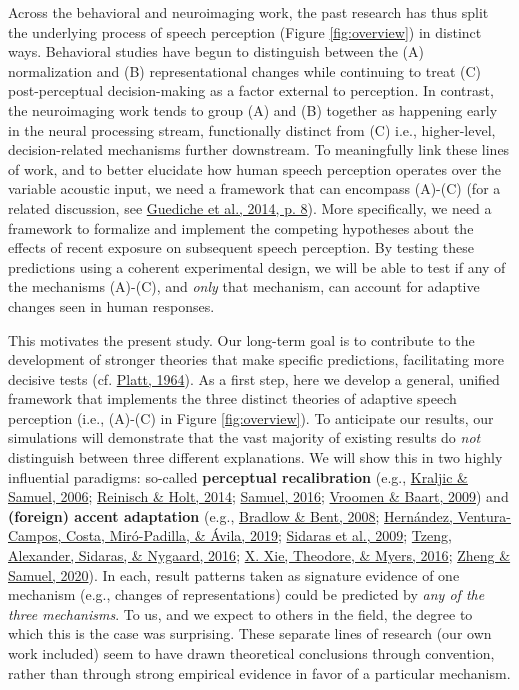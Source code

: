 \documentclass[
  11pt,
  english,
  man,floatsintext]{apa6}
\begin{document}
Across the behavioral and neuroimaging work, the past research has thus split the underlying process of speech perception (Figure \ref{fig:overview}) in distinct ways. Behavioral studies have begun to distinguish between the (A) normalization and (B) representational changes while continuing to treat (C) post-perceptual decision-making as a factor external to perception. In contrast, the neuroimaging work tends to group (A) and (B) together as happening early in the neural processing stream, functionally distinct from (C) i.e., higher-level, decision-related mechanisms further downstream. To meaningfully link these lines of work, and to better elucidate how human speech perception operates over the variable acoustic input, we need a framework that can encompass (A)-(C) (for a related discussion, see \protect\hyperlink{ref-guediche2014}{Guediche et al., 2014, p. 8}). More specifically, we need a framework to formalize and implement the competing hypotheses about the effects of recent exposure on subsequent speech perception. By testing these predictions using a coherent experimental design, we will be able to test if any of the mechanisms (A)-(C), and \emph{only} that mechanism, can account for adaptive changes seen in human responses.

This motivates the present study. Our long-term goal is to contribute to the development of stronger theories that make specific predictions, facilitating more decisive tests (cf. \protect\hyperlink{ref-platt1964}{Platt, 1964}). As a first step, here we develop a general, unified framework that implements the three distinct theories of adaptive speech perception (i.e., (A)-(C) in Figure \ref{fig:overview}). To anticipate our results, our simulations will demonstrate that the vast majority of existing results do \emph{not} distinguish between three different explanations. We will show this in two highly influential paradigms: so-called \textbf{perceptual recalibration} (e.g., \protect\hyperlink{ref-kraljic-samuel2006}{Kraljic \& Samuel, 2006}; \protect\hyperlink{ref-reinisch-holt2014}{Reinisch \& Holt, 2014}; \protect\hyperlink{ref-samuel2016}{Samuel, 2016}; \protect\hyperlink{ref-vroomen-baart2009}{Vroomen \& Baart, 2009}) and \textbf{(foreign) accent adaptation} (e.g., \protect\hyperlink{ref-bradlow-bent2008}{Bradlow \& Bent, 2008}; \protect\hyperlink{ref-hernandez2019}{Hernández, Ventura-Campos, Costa, Miró-Padilla, \& Ávila, 2019}; \protect\hyperlink{ref-sidaras2009}{Sidaras et al., 2009}; \protect\hyperlink{ref-tzeng2016}{Tzeng, Alexander, Sidaras, \& Nygaard, 2016}; \protect\hyperlink{ref-xie2016jep}{X. Xie, Theodore, \& Myers, 2016}; \protect\hyperlink{ref-zheng-samuel2020}{Zheng \& Samuel, 2020}). In each, result patterns taken as signature evidence of one mechanism (e.g., changes of representations) could be predicted by \emph{any of the three mechanisms}. To us, and we expect to others in the field, the degree to which this is the case was surprising. These separate lines of research (our own work included) seem to have drawn theoretical conclusions through convention, rather than through strong empirical evidence in favor of a particular mechanism.
\end{document}

